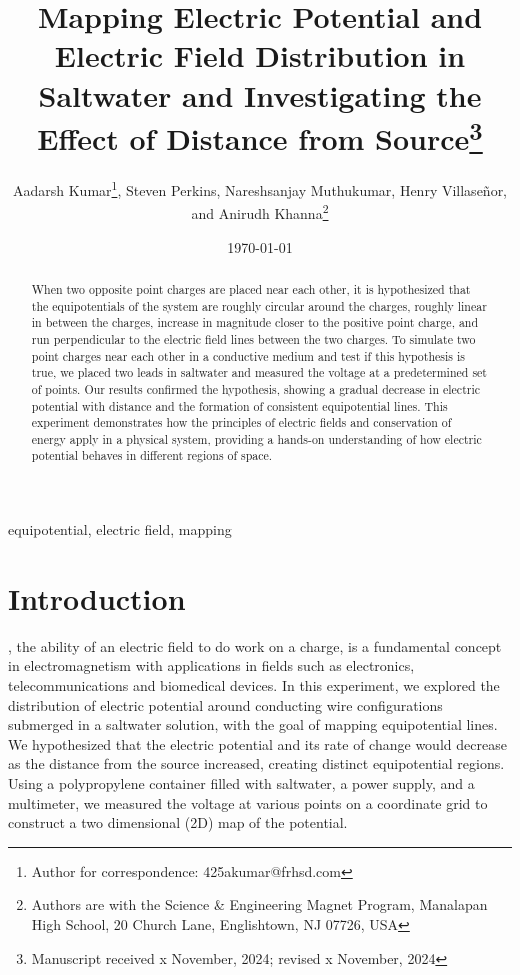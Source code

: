 ﻿\documentclass[10pt,journal,twoside]{IEEEtran}
\title{Mapping Electric Potential and Electric Field Distribution in Saltwater and Investigating the Effect of Distance from Source\thanks{Manuscript received x November, 2024; revised x November, 2024}}
\author{Aadarsh Kumar\thanks{Author for correspondence: 425akumar@frhsd.com}, Steven Perkins, Nareshsanjay Muthukumar, Henry Villase\~{n}or, and Anirudh Khanna\thanks{Authors are with the Science \& Engineering Magnet Program, Manalapan High School, 20 Church Lane, Englishtown, NJ 07726, USA}}
\date{\today}
\begin{document}
\maketitle

\begin{abstract}
When two opposite point charges are placed near each other, it is hypothesized that the equipotentials of the system are roughly circular around the charges, roughly linear in between the charges, increase in magnitude closer to the positive point charge, and run perpendicular to the electric field lines between the two charges. To simulate two point charges near each other in a conductive medium and test if this hypothesis is true, we placed two leads in saltwater and measured the voltage at a predetermined set of points. Our results confirmed the hypothesis, showing a gradual decrease in electric potential with distance and the formation of consistent equipotential lines. This experiment demonstrates how the principles of electric fields and conservation of energy apply in a physical system, providing a hands-on understanding of how electric potential behaves in different regions of space.
\end{abstract}

\begin{IEEEkeywords}
equipotential, electric field, mapping
\end{IEEEkeywords}

\section{Introduction}
, the ability of an electric field to do work on a charge, is a fundamental concept in electromagnetism \cite{tipler} with applications in fields such as electronics, telecommunications and biomedical devices. In this experiment, we explored the distribution of electric potential around conducting wire configurations submerged in a saltwater solution, with the goal of mapping equipotential lines. We hypothesized that the electric potential and its rate of change would decrease as the distance from the source increased, creating distinct equipotential regions. Using a polypropylene container filled with saltwater, a power supply, and a multimeter, we measured the voltage at various points on a coordinate grid to construct a two dimensional (2D) map of the potential.
 
 
 
 
 
 
\end{document}
